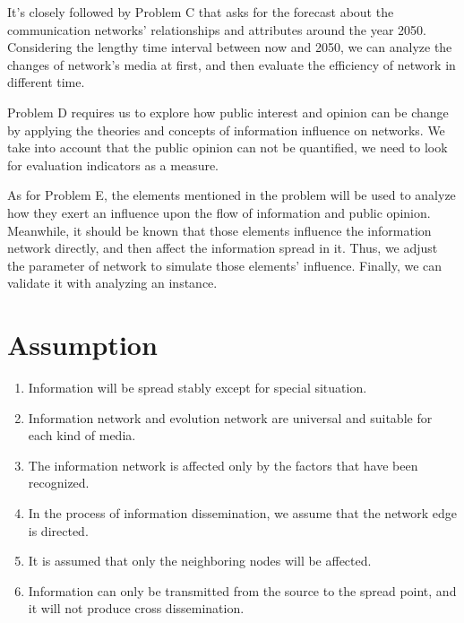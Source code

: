 \documentclass[a4paper,11pt]{article}
\begin{document}
\par It's closely followed by Problem C that asks for the forecast about the communication networks' relationships and attributes around the year 2050. Considering the lengthy time interval between now and 2050, we can analyze the changes of network's media at first, and then evaluate the efficiency of network in different time. 

\par Problem D requires us to explore how public interest and opinion can be change by applying the theories and concepts of information influence on networks. We take into account that the public opinion can not be quantified, we need to look for evaluation indicators as a measure. 
 
\par As for Problem E, the elements mentioned in the problem will be used to analyze how they exert an influence upon the flow of information and public opinion. Meanwhile, it should be known that those elements influence the information network directly, and then affect the information spread in it. Thus, we adjust the parameter of network to simulate those elements' influence. Finally, we can validate it with analyzing an instance.



























\section{Assumption}
\begin{enumerate}%
\renewcommand{\labelenumi}{(\theenumi)}
    \item Information will be spread stably except for special situation.
    \item Information network and evolution network are universal and suitable for each kind of media.
    \item The information network is affected  only by the factors that have been recognized.
    \item In the process of information dissemination, we assume that the network edge is directed.
    \item It is assumed that only the neighboring nodes will be affected.
    \item Information can only be transmitted from the source to the spread point, and it will not produce cross dissemination.
\end{enumerate}
\end{document}
